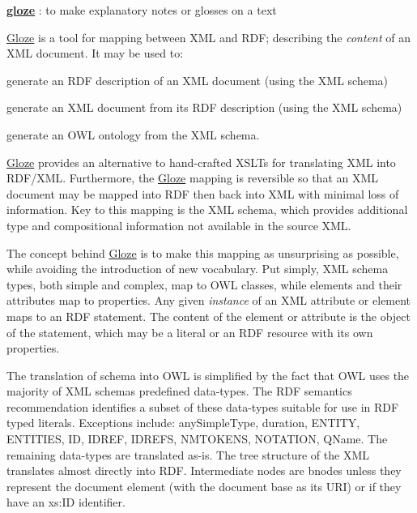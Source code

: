 {\bfseries \hyperlink{namespacecom_1_1hp_1_1gloze}{gloze}} : to make explanatory notes or glosses on a text

\hyperlink{classcom_1_1hp_1_1gloze_1_1_gloze}{Gloze} is a tool for mapping between XML and RDF; describing the {\itshape content\/} of an XML document. It may be used to:
\begin{DoxyItemize}
\item generate an RDF description of an XML document (using the XML schema)
\item generate an XML document from its RDF description (using the XML schema)
\item generate an OWL ontology from the XML schema.
\end{DoxyItemize}

\hyperlink{classcom_1_1hp_1_1gloze_1_1_gloze}{Gloze} provides an alternative to hand-\/crafted XSLTs for translating XML into RDF/XML. Furthermore, the \hyperlink{classcom_1_1hp_1_1gloze_1_1_gloze}{Gloze} mapping is reversible so that an XML document may be mapped into RDF then back into XML with minimal loss of information. Key to this mapping is the XML schema, which provides additional type and compositional information not available in the source XML.

The concept behind \hyperlink{classcom_1_1hp_1_1gloze_1_1_gloze}{Gloze} is to make this mapping as unsurprising as possible, while avoiding the introduction of new vocabulary. Put simply, XML schema types, both simple and complex, map to OWL classes, while elements and their attributes map to properties. Any given {\itshape instance\/} of an XML attribute or element maps to an RDF statement. The content of the element or attribute is the object of the statement, which may be a literal or an RDF resource with its own properties.

The translation of schema into OWL is simplified by the fact that OWL uses the majority of XML schemas predefined data-\/types. The RDF semantics recommendation identifies a subset of these data-\/types suitable for use in RDF typed literals. Exceptions include: anySimpleType, duration, ENTITY, ENTITIES, ID, IDREF, IDREFS, NMTOKENS, NOTATION, QName. The remaining data-\/types are translated as-\/is. The tree structure of the XML translates almost directly into RDF. Intermediate nodes are bnodes unless they represent the document element (with the document base as its URI) or if they have an xs:ID identifier.

